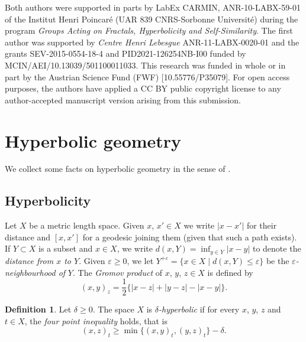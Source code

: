 \documentclass[leqno,a4paper,10pt]{amsart}
\theoremstyle{plain}
\theoremstyle{definition}
\newtheorem{df}[thm]{Definition}
\theoremstyle{remark}
\let\le\leqslant
\let\ge\geqslant
\begin{document}
Both authors were supported in parts by LabEx CARMIN, ANR-10-LABX-59-01 of the Institut Henri Poincar\'e (UAR 839 CNRS-Sorbonne Universit\'e) during the program \emph{Groups Acting on Fractals, Hyperbolicity and Self-Similarity}.
The first author was supported by \emph{Centre Henri Lebesgue} ANR-11-LABX-0020-01 and the grants  SEV-2015-0554-18-4 and PID2021-126254NB-I00 funded by MCIN/AEI/10.13039/501100011033. This research was funded in whole or in part by the Austrian Science Fund (FWF) [10.55776/P35079]. For open access purposes, the authors have applied a CC BY public copyright license to any author-accepted manuscript version arising from this submission.



\section{Hyperbolic geometry}

\label{sec:hyperbolic-geometry}

We collect some facts on hyperbolic geometry in the sense of \cite{gromov_hyperbolic_1987,coornaert_geometrie_1990,ghys_sur_1990}.

\subsection{Hyperbolicity}

\label{subsec:hyperbolicity}

Let $X$ be a metric length space. Given $x$, $x' \in X$ we write $|x-x'|$ for their distance and $[x,x']$ for a geodesic joining them (given that such a path exists). If $Y \subset X$ is a subset and $x \in X$, we write $d(x,Y) = \inf_{y\in Y} |x-y|$ to denote the \emph{distance from $x$ to $Y$}. %
 Given $\varepsilon \ge 0$, we let $Y^{+\varepsilon}=\{x \in X \mid d(x,Y) \le \varepsilon\}$ be the \emph{$\varepsilon$-neighbourhood of} $Y$. The \emph{Gromov product} of $x$, $y$, $z \in X$  is defined by
$$
	(x,y)_z = \frac 12 \{ |x-z| + |y-z| - |x-y| \}.
$$

\begin{df}
\label{df:hyperbolicity}
Let $\delta\ge 0$. The space $X$ is \emph{$\delta$-hyperbolic} if for every $x$, $y$, $z$ and $t\in X$, the \emph{four point inequality} holds, that is
$$
	(x,z)_t\ge \min \{ (x,y)_t,(y,z)_t \} - \delta.
$$
\end{df}
\end{document}
